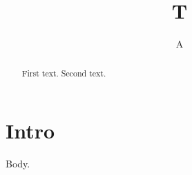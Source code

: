 \documentclass{article}
\begin{document}
\title{T}\author{A}\maketitle
\begin{abstract}
First text.
\tableofcontents
Second text.
\end{abstract}
\section{Intro}
Body.
\end{document}
